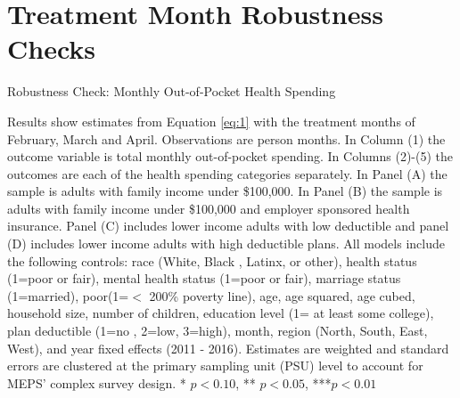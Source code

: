 \documentclass[smallcondensed,referee]{svjour3}
\makeatletter
\let\estinput=%
\newcommand{\estwide}[3]{
		\vspace{.75ex}{
			\begin{tabular*}
			{\textwidth}{@{\hskip\tabcolsep\extracolsep\fill}l*{#2}{#3}}
			\toprule
			\estinput{#1}
			\bottomrule
			\addlinespace[.75ex]
			\end{tabular*}
			}
		}
\makeatother
\begin{document}
\section{Treatment Month Robustness Checks}
\begin{table}[h!] \caption{Robustness Check: Monthly Out-of-Pocket Health Spending} \label{table3_robustnesscheck}
	\begin{minipage}{15cm}
		\footnotesize

Results show estimates from Equation \ref{eq:1} with the treatment months of February, March and April. Observations are person months.  In Column (1) the outcome variable is total monthly out-of-pocket spending. In Columns (2)-(5) the outcomes are each of the health spending categories separately.  In Panel (A) the sample is adults with family income under \$100,000.
In Panel (B) the sample is adults with family income under \$100,000 and employer sponsored health insurance. Panel (C) includes lower income adults with low deductible and panel (D) includes lower income adults with high deductible plans. All models include the following controls:  race (White, Black , Latinx, or other), health status (1=poor or fair), mental health status (1=poor or fair), marriage status (1=married), poor(1=$<$ 200\% poverty line), age, age squared, age cubed, household size, number of children, education level (1= at least some college), plan deductible (1=no , 2=low, 3=high), month, region (North, South, East, West), and year fixed effects (2011 - 2016). Estimates are weighted and standard errors are clustered at the primary sampling unit (PSU) level to account for MEPS’ complex survey design. * $p<0.10$, ** $p<0.05$, ***$ p<0.01$
	\end{minipage}
\end{table}
\end{document}
